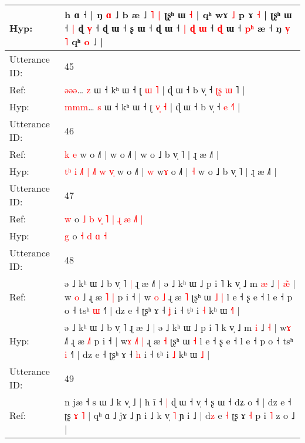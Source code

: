 \documentclass[10pt]{article}
\DeclareRobustCommand{\hl}[1]{{\textcolor{red}{#1}}}
\begin{document}
\begin{longtable}{ll}
 \\
Hyp: & h ɑ ˧ | ŋ \hl{}\hl{ɑ} ˩ b æ ˩\hl{}\hl{} \hl{}\hl{˥} \hl{|} ʈʂʰ ɯ \hl{˧} |\hl{}\hl{}\hl{}\hl{}\hl{}\hl{}\hl{}\hl{} qʰ wɤ \hl{˩} p ɤ \hl{˧} | ʈʂʰ ɯ ˧\hl{ }\hl{|} ɖ \hl{v}\hl{̩} ˧ ɖ ɯ ˧\hl{}\hl{} \hl{}ʂ\hl{} ɯ ˧ ɖ ɯ ˧\hl{}\hl{}\hl{}\hl{} \hl{|} \hl{ɖ} \hl{}\hl{ɯ} ˧ \hl{}\hl{}\hl{ɖ} ɯ ˧ \hl{p}\hl{ʰ} æ ˧\hl{}\hl{} ŋ \hl{v}\hl{̩} \hl{˥} qʰ \hl{}\hl{o} ˩ |
 \\
\midrule
Utterance ID: & 45 \\
Ref: & \hl{ə}\hl{ə}\hl{ə}… \hl{z} ɯ ˧ kʰ ɯ ˧ ʈ \hl{}\hl{ɯ} \hl{˥} | ɖ ɯ ˧ b v̩ ˧ \hl{ʈ}\hl{ʂ} \hl{ɯ}\hl{ }˥ |
 \\
Hyp: & \hl{m}\hl{m}\hl{m}… \hl{s} ɯ ˧ kʰ ɯ ˧ ʈ \hl{v}\hl{̩} \hl{˧} | ɖ ɯ ˧ b v̩ ˧ \hl{}\hl{e} \hl{}\hl{˧}˥ |
 \\
\midrule
Utterance ID: & 46 \\
Ref: & \hl{}\hl{}\hl{}\hl{}\hl{}\hl{}\hl{}\hl{}\hl{}\hl{}\hl{}\hl{}\hl{}\hl{k} \hl{}\hl{e} w o ˩˥ |\hl{}\hl{} w\hl{} o ˩˥ |\hl{}\hl{} w o ˩ b v̩ ˥ | ɻ æ ˩˥ |
 \\
Hyp: & \hl{t}\hl{ʰ}\hl{ }\hl{i}\hl{ }\hl{˩}\hl{˥}\hl{ }\hl{|}\hl{ }\hl{˩}\hl{˥}\hl{ }\hl{w} \hl{v}\hl{̩} w o ˩˥ |\hl{ }\hl{w} w\hl{ɤ} o ˩˥ |\hl{ }\hl{˧} w o ˩ b v̩ ˥ | ɻ æ ˩˥ |
 \\
\midrule
Utterance ID: & 47 \\
Ref: & \hl{w} o\hl{ }\hl{˩}\hl{ }\hl{b}\hl{ }\hl{v}\hl{̩}\hl{ }\hl{˥}\hl{ }\hl{|} \hl{ɻ} \hl{æ} \hl{˩}\hl{˥} \hl{|}
 \\
Hyp: & \hl{g} o\hl{}\hl{}\hl{}\hl{}\hl{}\hl{}\hl{}\hl{}\hl{}\hl{}\hl{} \hl{˧} \hl{d} \hl{}\hl{ɑ} \hl{˧}
 \\
\midrule
Utterance ID: & 48 \\
Ref: & ə ˩ kʰ ɯ ˩ b v̩ ˥\hl{ }\hl{|} ɻ æ ˩\hl{˥} | ə ˩ kʰ ɯ ˩ p i ˥ k v̩ ˩ m \hl{æ} ˩\hl{ }\hl{|} \hl{æ}\hl{̃} | w\hl{ }\hl{o} ˩\hl{} ɻ æ \hl{˥}\hl{ }\hl{|} p i ˧ | w\hl{} \hl{}\hl{o} \hl{˩} ɻ æ \hl{˥} ʈʂʰ ɯ\hl{ }\hl{˩} \hl{|} l e ˧ ʂ e ˧ l e ˧ p o ˧ tsʰ \hl{ɯ} ˧˥ | dz e ˧ ʈʂʰ ɤ ˧ \hl{ʝ} i ˧ tʰ i \hl{˧} kʰ ɯ \hl{˧}\hl{˥} |
 \\
Hyp: & ə ˩ kʰ ɯ ˩ b v̩ ˥\hl{}\hl{} ɻ æ ˩\hl{} | ə ˩ kʰ ɯ ˩ p i ˥ k v̩ ˩ m \hl{i} ˩\hl{}\hl{} \hl{}\hl{˧} | w\hl{}\hl{ɤ} ˩\hl{˥} ɻ æ \hl{}\hl{˩}\hl{˥} p i ˧ | w\hl{ɤ} \hl{˩}\hl{˥} \hl{|} ɻ æ \hl{˧} ʈʂʰ ɯ\hl{}\hl{} \hl{˧} l e ˧ ʂ e ˧ l e ˧ p o ˧ tsʰ \hl{i} ˧˥ | dz e ˧ ʈʂʰ ɤ ˧ \hl{h} i ˧ tʰ i \hl{˩} kʰ ɯ \hl{}\hl{˩} |
 \\
\midrule
Utterance ID: & 49 \\
Ref: & n jæ ˧ s ɯ ˩ k v̩ ˩ | h ĩ ˧\hl{ }\hl{|} ɖ ɯ ˧ v̩ ˧\hl{}\hl{} ʂ ɯ ˧ dʑ o ˧ | dz e ˧ ʈʂ\hl{} \hl{}\hl{ɤ} \hl{˥} | qʰ ɑ ˩ jɤ ˩ ɲ i ˩ k v̩ \hl{˥} ɲ i ˩ | d\hl{z} e \hl{˧} ʈʂ\hl{} ɤ\hl{}\hl{} \hl{˧} p i \hl{˥} z o ˩ |

\end{longtable}
\end{document}
